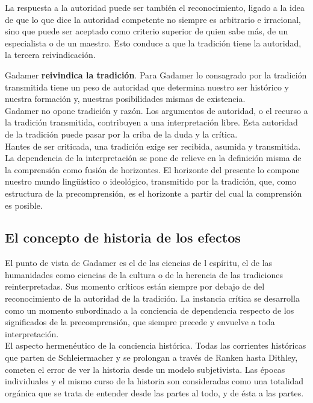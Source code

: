 \documentclass[a4paper, 11pt, twocolumn, spanish]{article}
\begin{document}
La respuesta a la autoridad puede ser también el reconocimiento,
ligado a la idea de que lo que dice la autoridad competente no
siempre es arbitrario e irracional, sino que puede ser aceptado como
criterio superior de quien sabe más, de un especialista o de un
maestro.  Esto conduce a que la tradición tiene la autoridad, la
tercera reivindicación.

Gadamer \textbf{reivindica la tradición}. Para Gadamer lo consagrado por la
tradición transmitida tiene un peso de autoridad que determina nuestro
ser histórico y nuestra formación y, nuestras posibilidades mismas de
existencia.\\[0pt]

Gadamer no opone tradición y razón. Los argumentos de autoridad, o el
recurso a la tradición transmitida, contribuyen a una interpretación
libre. Esta autoridad de la tradición puede pasar por la criba de la
duda y la crítica.\\[0pt]


Hantes de ser criticada, una tradición exige ser recibida, asumida y
transmitida. La dependencia de la interpretación se pone de relieve en
la definición misma de la comprensión como fusión de horizontes. El
horizonte del presente lo compone nuestro mundo lingüístico o
ideológico, transmitido por la tradición, que, como estructura de la
precomprensión, es el horizonte a partir del cual la comprensión es
posible.

\subsection{El concepto de historia de los efectos}
\label{sec:orgca82937}
El punto de vista de Gadamer es el de las ciencias de l espíritu, el
de las humanidades como ciencias de la cultura o de la herencia de las
tradiciones reinterpretadas. Sus momento críticos están siempre por
debajo de del reconocimiento de la autoridad de la tradición. La
instancia crítica se desarrolla como un momento subordinado a la
conciencia de dependencia respecto de los significados de la
precomprensión, que siempre precede y envuelve a toda interpretación.\\[0pt]

El aspecto hermenéutico de la conciencia histórica. Todas las
corrientes históricas que parten de Schleiermacher y se prolongan a
través de Ranken hasta Dithley, cometen el error de ver la historia
desde un modelo subjetivista. Las épocas individuales y el mismo curso
de la historia son consideradas como una totalidad orgánica que se
trata de entender desde las partes al todo, y de ésta a las partes.\\[0pt]
\end{document}
